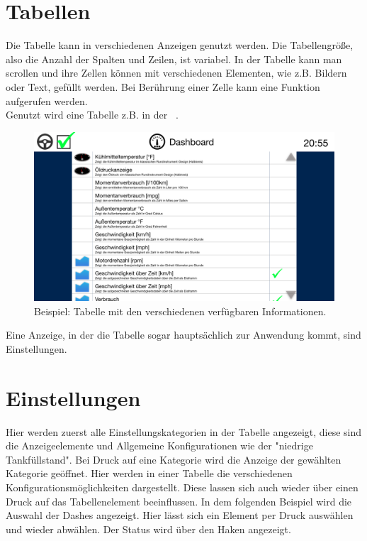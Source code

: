 \documentclass[pflichtenheft.tex]{subfiles}
\begin{document}
\clearpage
\section{Tabellen}

Die Tabelle kann in verschiedenen Anzeigen genutzt werden. Die Tabellengröße, also die Anzahl der Spalten und Zeilen, ist variabel. In der Tabelle kann man scrollen und ihre Zellen können mit verschiedenen Elementen, wie z.B. Bildern oder Text, gefüllt werden. Bei Berührung einer Zelle kann eine Funktion aufgerufen werden.\\
Genutzt wird eine Tabelle z.B. in der ~. 

\begin{figure}[H]
  	\begin{center}
 		\includegraphics[width=\textwidth]{Images/GUI-Settings.png}
  		\caption{Beispiel: Tabelle mit den verschiedenen verfügbaren Informationen.}
  	\end{center}
\end{figure}


Eine Anzeige, in der die Tabelle sogar hauptsächlich zur Anwendung kommt, sind Einstellungen. 


\clearpage
\section{Einstellungen}
Hier werden zuerst alle Einstellungskategorien in der Tabelle angezeigt, diese sind die Anzeigeelemente und Allgemeine Konfigurationen wie der "niedrige Tankfüllstand". Bei Druck auf eine Kategorie wird die Anzeige der gewählten Kategorie geöffnet. Hier werden in einer Tabelle die verschiedenen Konfigurationsmöglichkeiten dargestellt. Diese lassen sich auch wieder über einen Druck auf das Tabellenelement beeinflussen. 
In dem folgenden Beispiel wird die Auswahl der Dashes angezeigt. Hier lässt sich ein Element per Druck auswählen und wieder abwählen. Der Status wird über den Haken angezeigt.
\end{document}
